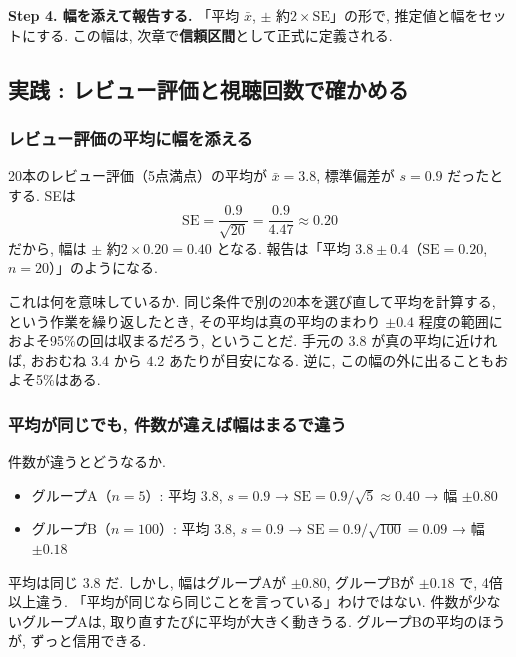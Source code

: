     \textbf{Step 4. 幅を添えて報告する.}
    「平均 $\bar{x}$, $\pm$ 約$2 \times \mathrm{SE}$」の形で, 推定値と幅をセットにする.
    この幅は, 次章で\textbf{信頼区間}として正式に定義される.

  \subsection{実践 : レビュー評価と視聴回数で確かめる}


    \subsubsection*{レビュー評価の平均に幅を添える}

    20本のレビュー評価（5点満点）の平均が $\bar{x} = 3.8$, 標準偏差が $s = 0.9$ だったとする.
    SEは
    \[
      \mathrm{SE} = \frac{0.9}{\sqrt{20}} = \frac{0.9}{4.47} \approx 0.20
    \]
    だから, 幅は $\pm$ 約$2 \times 0.20 = 0.40$ となる.
    報告は「平均 $3.8 \pm 0.4$（$\mathrm{SE} = 0.20$, $n = 20$）」のようになる.

    これは何を意味しているか.
    同じ条件で別の20本を選び直して平均を計算する, という作業を繰り返したとき, その平均は真の平均のまわり $\pm 0.4$ 程度の範囲におよそ95\%の回は収まるだろう, ということだ.
    手元の $3.8$ が真の平均に近ければ, おおむね $3.4$ から $4.2$ あたりが目安になる.
    逆に, この幅の外に出ることもおよそ5\%はある.

    \subsubsection*{平均が同じでも, 件数が違えば幅はまるで違う}

    件数が違うとどうなるか.
    \begin{itemize}
      \item グループA（$n = 5$）: 平均 $3.8$, $s = 0.9$ → $\mathrm{SE} = 0.9 / \sqrt{5} \approx 0.40$ → 幅 $\pm 0.80$
      \item グループB（$n = 100$）: 平均 $3.8$, $s = 0.9$ → $\mathrm{SE} = 0.9 / \sqrt{100} = 0.09$ → 幅 $\pm 0.18$
    \end{itemize}
    平均は同じ $3.8$ だ.
    しかし, 幅はグループAが $\pm 0.80$, グループBが $\pm 0.18$ で, 4倍以上違う.
    「平均が同じなら同じことを言っている」わけではない.
    件数が少ないグループAは, 取り直すたびに平均が大きく動きうる.
    グループBの平均のほうが, ずっと信用できる.

